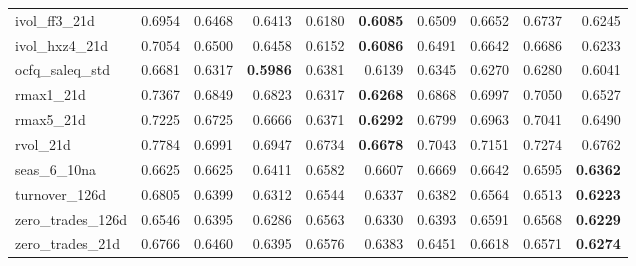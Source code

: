 \begin{longtable}{>{\raggedright\arraybackslash}p{2.6cm}rrrrrrrrr}
ivol\_ff3\_21d & 0.6954 & \cellcolor{blue!10}0.6468 & \cellcolor{blue!10}0.6413 & \cellcolor{blue!10}0.6180 & \textbf{\cellcolor{blue!10}0.6085} & \cellcolor{blue!10}0.6509 & \cellcolor{blue!10}0.6652 & \cellcolor{blue!10}0.6737 & \cellcolor{blue!10}0.6245 \\
ivol\_hxz4\_21d & 0.7054 & \cellcolor{blue!10}0.6500 & \cellcolor{blue!10}0.6458 & \cellcolor{blue!10}0.6152 & \textbf{\cellcolor{blue!10}0.6086} & \cellcolor{blue!10}0.6491 & \cellcolor{blue!10}0.6642 & \cellcolor{blue!10}0.6686 & \cellcolor{blue!10}0.6233 \\
ocfq\_saleq\_std & 0.6681 & \cellcolor{blue!10}0.6317 & \textbf{\cellcolor{blue!10}0.5986} & \cellcolor{blue!10}0.6381 & \cellcolor{blue!10}0.6139 & \cellcolor{blue!10}0.6345 & \cellcolor{blue!10}0.6270 & \cellcolor{blue!10}0.6280 & \cellcolor{blue!10}0.6041 \\
rmax1\_21d & 0.7367 & \cellcolor{blue!10}0.6849 & \cellcolor{blue!10}0.6823 & \cellcolor{blue!10}0.6317 & \textbf{\cellcolor{blue!10}0.6268} & \cellcolor{blue!10}0.6868 & \cellcolor{blue!10}0.6997 & \cellcolor{blue!10}0.7050 & \cellcolor{blue!10}0.6527 \\
rmax5\_21d & 0.7225 & \cellcolor{blue!10}0.6725 & \cellcolor{blue!10}0.6666 & \cellcolor{blue!10}0.6371 & \textbf{\cellcolor{blue!10}0.6292} & \cellcolor{blue!10}0.6799 & \cellcolor{blue!10}0.6963 & \cellcolor{blue!10}0.7041 & \cellcolor{blue!10}0.6490 \\
rvol\_21d & 0.7784 & \cellcolor{blue!10}0.6991 & \cellcolor{blue!10}0.6947 & \cellcolor{blue!10}0.6734 & \textbf{\cellcolor{blue!10}0.6678} & \cellcolor{blue!10}0.7043 & \cellcolor{blue!10}0.7151 & \cellcolor{blue!10}0.7274 & \cellcolor{blue!10}0.6762 \\
seas\_6\_10na & 0.6625 & \cellcolor{blue!10}0.6625 & \cellcolor{blue!10}0.6411 & \cellcolor{blue!10}0.6582 & \cellcolor{blue!10}0.6607 & 0.6669 & 0.6642 & \cellcolor{blue!10}0.6595 & \textbf{\cellcolor{blue!10}0.6362} \\
turnover\_126d & 0.6805 & \cellcolor{blue!10}0.6399 & \cellcolor{blue!10}0.6312 & \cellcolor{blue!10}0.6544 & \cellcolor{blue!10}0.6337 & \cellcolor{blue!10}0.6382 & \cellcolor{blue!10}0.6564 & \cellcolor{blue!10}0.6513 & \textbf{\cellcolor{blue!10}0.6223} \\
zero\_trades\_126d & 0.6546 & \cellcolor{blue!10}0.6395 & \cellcolor{blue!10}0.6286 & 0.6563 & \cellcolor{blue!10}0.6330 & \cellcolor{blue!10}0.6393 & 0.6591 & 0.6568 & \textbf{\cellcolor{blue!10}0.6229} \\
zero\_trades\_21d & 0.6766 & \cellcolor{blue!10}0.6460 & \cellcolor{blue!10}0.6395 & \cellcolor{blue!10}0.6576 & \cellcolor{blue!10}0.6383 & \cellcolor{blue!10}0.6451 & \cellcolor{blue!10}0.6618 & \cellcolor{blue!10}0.6571 & \textbf{\cellcolor{blue!10}0.6274} \\

\end{longtable}
